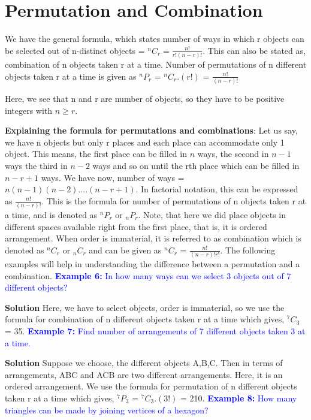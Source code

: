 \documentclass[12pt, a4paper]{article}
\begin{document}
\section {Permutation and Combination}
\begin{tcolorbox}[colback=TealBlue!10!White,colframe=TealBlue!50!black]
We have the general formula, which states number of ways in which r objects can be selected out of n-distinct objects = $^{n}C_{r} = \frac{n!}{r!(n-r)!}$. This can also be stated as, combination of n objects taken r at a time. \newline
Number of permutations of n different objects taken r at a time is given as $^nP_r$ = $^{n}C_{r}.(r!)$ = $\frac{n!}{(n-r)!}$
\end{tcolorbox} 
Here, we see that n and r are number of objects, so they have to be positive integers with $n \geq r$. \newline \vspace{1mm}

\textbf{Explaining the formula for permutations and combinations}:
Let us say, we have n objects but only r places and each place can accommodate only 1 object. This means, the first place can be filled in $n$ ways, the second in $n-1$ ways the third in $n-2$ ways and so on until the rth place which can be filled in $n-r+1$ ways. We have now, number of ways = $n(n-1)(n-2)....(n-r+1)$. In factorial notation, this can be expressed as $\frac{n!}{(n-r)!}$. This is the formula for number of permutations of n objects taken r at a time, and is denoted as $^nP_r$ or $_nP_r$. Note, that here we did place objects in different spaces available right from the first place, that is, it is ordered arrangement. When order is immaterial, it is referred to as combination which is denoted as $^nC_r$ or $_nC_r$ and can be given as $^nC_r$ = $\frac{n!}{(n-r)! r!}$. \newline The following examples will help in understanding the difference between a permutation and a combination.\newline
\textcolor{blue}{\textbf{Example 6:} In how many ways can we select 3 objects out of 7 different objects?}

\textbf{Solution} Here, we have to select objects, order is immaterial, so we use the formula for combination of n different objects taken r at a time which gives, $^7C_3$ = 35.\newline
\textcolor{blue}{\textbf{Example 7:} Find number of arrangements of 7 different objects taken 3 at a time.}

\textbf{Solution} Suppose we choose, the different objects A,B,C. Then in terms of arrangements, ABC and ACB are two different arrangements. Here, it is an ordered arrangement. We use the formula for permutation of n different objects taken r at a time which gives, $^7P_3$ = $^7C_3.(3!)$ = 210.\newline
\textcolor{blue}{\textbf{Example 8:} How many triangles can be made by joining vertices of a hexagon?}
\end{document}
